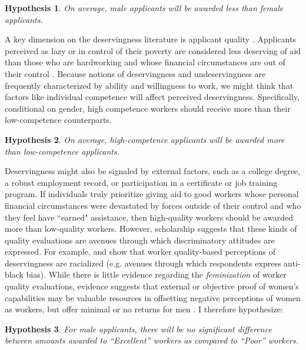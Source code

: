\documentclass[12pt]{article}%
\newtheorem{hypothesis}{Hypothesis}
\begin{document}
\begin{doublespace}
\begin{hypothesis} \label{hyp:first}
	On average, male applicants will be awarded less than female applicants.
\end{hypothesis}

A key dimension on the deservingness literature is applicant quality \citep{petersen2012deserves, petersen2012social}. Applicants perceived as lazy or in control of their poverty are considered less deserving of aid than those who are hardworking and whose financial circumstances are out of their control \citep{aaroe2014crowding}. Because notions of deservingness and undeservingness are frequently characterized by ability and willingness to work, we might think that factors like individual competence will affect perceived deservingness. Specifically, conditional on gender, high competence workers should receive more than their low-competence counterparts.


\begin{hypothesis} \label{hyp:second}
	On average, high-competence applicants will be awarded more than low-competence applicants.
\end{hypothesis}


Deservingness might also be signaled by external factors, such as a college degree, a robust employment record, or participation in a certificate or job training program. If individuals truly prioritize giving aid to good workers whose personal financial circumstances were devastated by forces outside of their control and who they feel have ``earned" assistance, then high-quality workers should be awarded more than low-quality workers. However, scholarship suggests that these kinds of quality evaluations are avenues through which discriminatory attitudes are expressed. For example, \cite{gilens_why_2000} and \cite{desante_working_2013} show that worker quality-based perceptions of deservingness are racialized (e.g. avenues through which respondents express anti-black bias). While there is little evidence regarding the \textit{feminization} of worker quality evaluations, evidence suggests that external or objective proof of women’s capabilities may be valuable resources in offsetting negative perceptions of women as workers, but offer minimal or no returns for men \citep{abel_value_2020, dadgar_labor_2015, jepsen_labor-market_2014}. I therefore hypothesize:


\begin{hypothesis} \label{hyp:thirda}
	For male applicants, there will be no significant difference between amounts awarded to ``Excellent” workers as compared to ``Poor” workers.
\end{hypothesis}


\end{doublespace}
\end{document}
